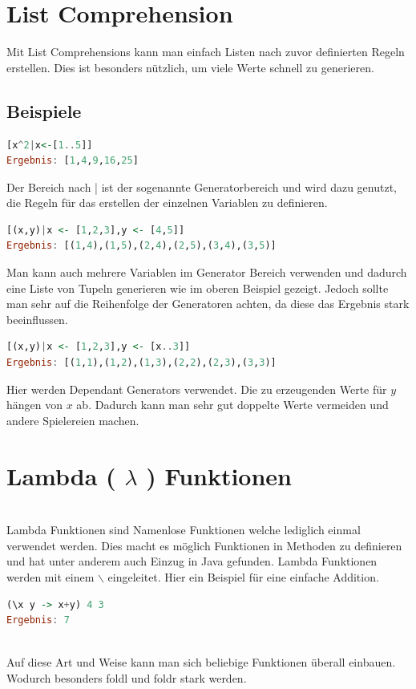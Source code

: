 \section{List Comprehension}
Mit List Comprehensions kann man einfach Listen nach zuvor definierten Regeln erstellen. Dies ist besonders nützlich, um viele Werte schnell zu generieren.
\subsection{Beispiele}
\begin{lstlisting}[language=Haskell]
[x^2|x<-[1..5]]
Ergebnis: [1,4,9,16,25] 
\end{lstlisting}
Der Bereich nach | ist der sogenannte Generatorbereich und wird dazu genutzt, die Regeln für das erstellen der einzelnen Variablen zu definieren. \\ 
\begin{lstlisting}[language=Haskell]
[(x,y)|x <- [1,2,3],y <- [4,5]]
Ergebnis: [(1,4),(1,5),(2,4),(2,5),(3,4),(3,5)] 
\end{lstlisting}
Man kann auch mehrere Variablen im Generator Bereich verwenden und dadurch eine Liste von Tupeln generieren wie im oberen Beispiel gezeigt.  Jedoch sollte man sehr auf die Reihenfolge der Generatoren achten, da diese das Ergebnis stark beeinflussen. \\
\begin{lstlisting}[language=Haskell]
[(x,y)|x <- [1,2,3],y <- [x..3]]
Ergebnis: [(1,1),(1,2),(1,3),(2,2),(2,3),(3,3)] 
\end{lstlisting}
Hier werden Dependant Generators verwendet. Die zu erzeugenden Werte für $y$ hängen von $x$ ab. Dadurch kann man sehr gut doppelte Werte vermeiden und andere Spielereien machen. \\

\section{Lambda ( $\lambda$ ) Funktionen}\qquad\\
Lambda Funktionen sind Namenlose Funktionen welche lediglich einmal verwendet werden. Dies macht es möglich Funktionen in Methoden zu definieren und hat unter anderem auch Einzug in Java gefunden. Lambda Funktionen werden mit einem $\backslash$ eingeleitet. Hier ein Beispiel für eine einfache Addition.\\
\begin{lstlisting}[language=Haskell]
(\x y -> x+y) 4 3
Ergebnis: 7
\end{lstlisting}\qquad\\
Auf diese Art und Weise kann man sich beliebige Funktionen überall einbauen. Wodurch besonders foldl und foldr stark werden. 
